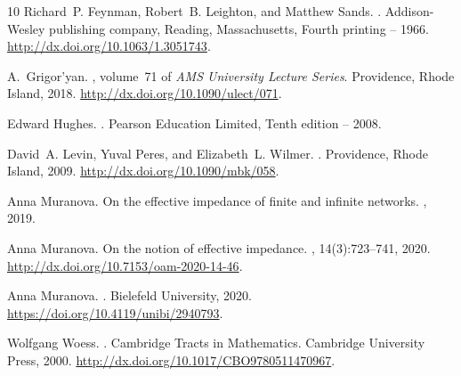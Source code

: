 \documentclass[a4paper,11pt]{amsart}
\theoremstyle{definition}
\begin{document}
\begin{thebibliography}{10}
Richard~P. Feynman, Robert~B. Leighton, and Matthew Sands.
.
\newblock Addison-Wesley publishing company, Reading, Massachusetts, Fourth
  printing -- 1966.
\newblock \url{http://dx.doi.org/10.1063/1.3051743}.

A.~Grigor'yan.
, volume~71 of {\em AMS
  University Lecture Series}.
\newblock Providence, Rhode Island, 2018.
\newblock \url{http://dx.doi.org/10.1090/ulect/071}.

Edward Hughes.
.
\newblock Pearson Education Limited, Tenth edition -- 2008.

David~A. Levin, Yuval Peres, and Elizabeth~L. Wilmer.
.
\newblock Providence, Rhode Island, 2009.
\newblock \url{http://dx.doi.org/10.1090/mbk/058}.

Anna Muranova.
\newblock On the effective impedance of finite and infinite networks.
, 2019.

Anna Muranova.
\newblock On the notion of effective impedance.
, 14(3):723--741, 2020.
\newblock \url{http://dx.doi.org/10.7153/oam-2020-14-46}.

Anna Muranova.
.
\newblock Bielefeld University, 2020.
\newblock \url{https://doi.org/10.4119/unibi/2940793}.

Wolfgang Woess.
.
\newblock Cambridge Tracts in Mathematics. Cambridge University Press, 2000.
\newblock \url{http://dx.doi.org/10.1017/CBO9780511470967}.

\end{thebibliography}
\end{document}
